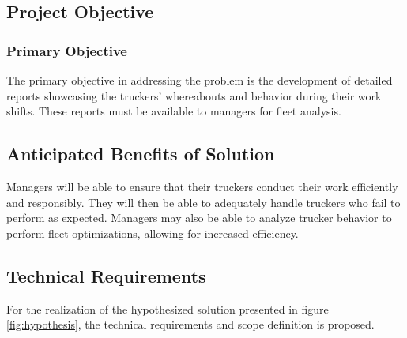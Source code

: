 \pagebreak
\subsection{Project Objective}
\subsubsection{Primary Objective}
The primary objective in addressing the problem is the development of detailed reports showcasing the truckers' whereabouts and behavior during their work shifts.
These reports must be available to managers for fleet analysis.

\subsection{Anticipated Benefits of Solution}
Managers will be able to ensure that their truckers conduct their work efficiently and responsibly.
They will then be able to adequately handle truckers who fail to perform as expected.
Managers may also be able to analyze trucker behavior to perform fleet optimizations, allowing for increased efficiency.

\subsection{Technical Requirements}
For the realization of the hypothesized solution presented in figure \ref{fig:hypothesis}, the technical requirements and scope definition is proposed.

